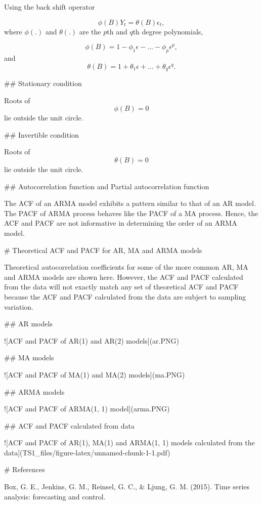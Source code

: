 \documentclass[11pt,a4paper,]{article}
\begin{document}
{Using the back shift operator

$$\phi(B)Y_t=\theta(B)\epsilon_t,$$
where $\phi(.)$ and $\theta(.)$ are the $p$th and $q$th degree polynomials,

$$\phi(B)=1-\phi_1 \epsilon -...-\phi_p \epsilon^p,$$
and
$$\theta(B)=1+\theta_1\epsilon+...+\theta_q\epsilon^q.$$

## Stationary condition

Roots of $$\phi(B)=0$$ lie outside the unit circle.

## Invertible condition

Roots of $$\theta(B)=0$$ lie outside the unit circle.


## Autocorrelation function and  Partial autocorrelation function

The ACF of an ARMA model exhibits a pattern similar to that of an AR model. The PACF of ARMA process behaves like the PACF of a MA process. Hence, the ACF and PACF are not informative in determining the order of an ARMA model.

# Theoretical ACF and PACF for AR, MA and ARMA models

Theoretical autocorrelation coefficients for some of the more common AR, MA and ARMA models are shown here. However, the ACF and PACF calculated from the data will not exactly match any set of theoretical ACF and PACF because the ACF and PACF calculated from the data are subject to sampling variation.

\newpage

## AR models

![ACF and PACF of AR(1) and AR(2) models](ar.PNG)

\newpage

## MA models

![ACF and PACF of MA(1) and MA(2) models](ma.PNG)

\newpage

## ARMA models

![ACF and PACF of ARMA(1, 1) model](arma.PNG)

\newpage

## ACF and PACF calculated from data

![\label{fig:unnamed-chunk-1}ACF and PACF of AR(1), MA(1) and ARMA(1, 1) models calculated from the data](TS1_files/figure-latex/unnamed-chunk-1-1.pdf) 

# References

Box, G. E., Jenkins, G. M., Reinsel, G. C., & Ljung, G. M. (2015). Time series analysis: forecasting and control.

}

\printbibliography
\end{document}
